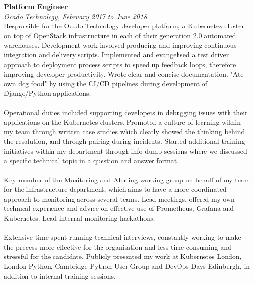 \documentclass{article}
\begin{document}
\begin{flushleft}
\textbf{Platform Engineer}\\
\textit{Ocado Technology, February 2017 to June 2018}\\[5pt]
Responsible for the Ocado Technology developer platform, a Kubernetes cluster on top of OpenStack infrastructure in each of their generation 2.0 automated warehouses. Development work involved producing and improving continuous integration and delivery scripts. Implemented and evangelised a test driven approach to deployment process scripts to speed up feedback loops, therefore improving developer productivity. Wrote clear and concise documentation. "Ate own dog food" by using the CI/CD pipelines during development of Django/Python applications.

\paragraph{}Operational duties included supporting developers in debugging issues with their applications on the Kubernetes clusters. Promoted a culture of learning within my team through written case studies which clearly showed the thinking behind the resolution, and through pairing during incidents. Started additional training initiatives within my department through info-dump sessions where we discussed a specific technical topic in a question and answer format.

\paragraph{}Key member of the Monitoring and Alerting working group on behalf of my team for the infrastructure department, which aims to have a more coordinated approach to monitoring across several teams. Lead meetings, offered my own technical experience and advice on effective use of Prometheus, Grafana and Kubernetes. Lead internal monitoring hackathons.

\paragraph{}Extensive time spent running technical interviews, constantly working to make the process more effective for the organisation and less time consuming and stressful for the candidate. Publicly presented my work at Kubernetes London, London Python, Cambridge Python User Group and DevOps Days Edinburgh, in addition to internal training sessions.\\[10pt]


\end{flushleft}
\end{document}
